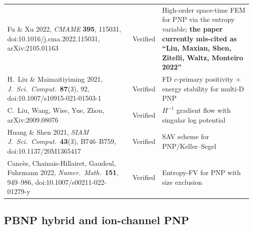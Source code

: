 \documentclass[11pt]{article}
\begin{document}
\begin{longtable}{@{}p{} p{} p{}@{}}
Fu \& Xu 2022, \emph{CMAME} \textbf{395}, 115031,
doi:10.1016/j.cma.2022.115031, arXiv:2105.01163 &
Verified &
High-order space-time FEM for PNP via the entropy variable; \textbf{the paper
currently mis-cited as ``Liu, Maxian, Shen, Zitelli, Waltz, Monteiro 2022''} \\
H.~Liu \& Maimaitiyiming 2021, \emph{J.~Sci.~Comput.}\ \textbf{87}(3), 92,
doi:10.1007/s10915-021-01503-1 &
Verified &
FD $c$-primary positivity $+$ energy stability for multi-D PNP \\
C.~Liu, Wang, Wise, Yue, Zhou, arXiv:2009.08076 &
Verified &
$H^{-1}$ gradient flow with singular log potential \\
Huang \& Shen 2021, \emph{SIAM J.~Sci.~Comput.}\ \textbf{43}(3), B746--B759,
doi:10.1137/20M1365417 &
Verified &
SAV scheme for PNP/Keller--Segel \\
Canc\`es, Chainais-Hillairet, Gaudeul, Fuhrmann 2022, \emph{Numer.~Math.}\
\textbf{151}, 949--986, doi:10.1007/s00211-022-01279-y &
Verified &
Entropy-FV for PNP with size exclusion \\
\bottomrule
\end{longtable}
\endgroup

\subsection{PBNP hybrid and ion-channel PNP}
\end{document}
